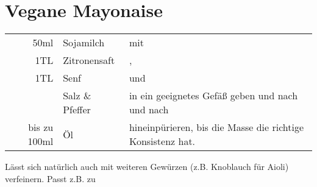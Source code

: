 \section{Vegane Mayonaise}\label{sec:vegan_mayo}
\begin{longtable}{rlL{16cm}}
    50ml            &   Sojamilch       &   mit \\
    1TL             &   Zitronensaft    &   ,   \\
    1TL             &   Senf            &   und \\
                    &   Salz \& Pfeffer &   in ein geeignetes Gefäß geben und nach und nach \\
    bis zu 100ml    &   Öl              &   hineinpürieren, bis die Masse die richtige Konsistenz hat.  \\
\end{longtable}

Lässt sich natürlich auch mit weiteren Gewürzen (z.B. Knoblauch für Aioli) verfeinern.
Passt z.B. zu 